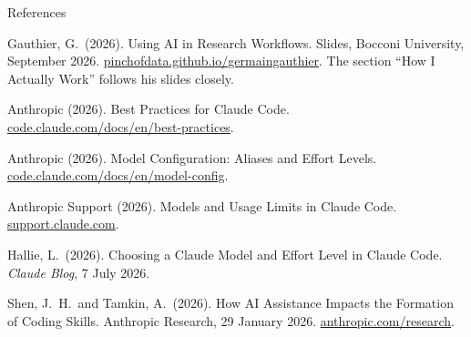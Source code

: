\documentclass[svgnames,x11names,dvipsnames]{beamer}
\begin{document}
\begin{frame}{References}

{\scriptsize

Gauthier, G.\ (2026). Using AI in Research Workflows. Slides, Bocconi University, September 2026. \href{https://pinchofdata.github.io/germaingauthier/pdfs/teaching/ai_research_workflow.pdf}{\textcolor{titleblue}{pinchofdata.github.io/germaingauthier}}. The section ``How I Actually Work'' follows his slides closely.

\vspace{0.1cm}

Anthropic (2026). Best Practices for Claude Code. \href{https://code.claude.com/docs/en/best-practices}{\textcolor{titleblue}{code.claude.com/docs/en/best-practices}}.

\vspace{0.1cm}

Anthropic (2026). Model Configuration: Aliases and Effort Levels. \href{https://code.claude.com/docs/en/model-config}{\textcolor{titleblue}{code.claude.com/docs/en/model-config}}.

\vspace{0.1cm}

Anthropic Support (2026). Models and Usage Limits in Claude Code. \href{https://support.claude.com/en/articles/14552983-models-usage-limits-in-claude-code}{\textcolor{titleblue}{support.claude.com}}.

\vspace{0.1cm}

Hallie, L.\ (2026). Choosing a Claude Model and Effort Level in Claude Code. \textit{Claude Blog}, 7 July 2026.

\vspace{0.1cm}

Shen, J.\ H.\ and Tamkin, A.\ (2026). How AI Assistance Impacts the Formation of Coding Skills. Anthropic Research, 29 January 2026. \href{https://www.anthropic.com/research/AI-assistance-coding-skills}{\textcolor{titleblue}{anthropic.com/research}}.

}

\end{frame}
\end{document}
